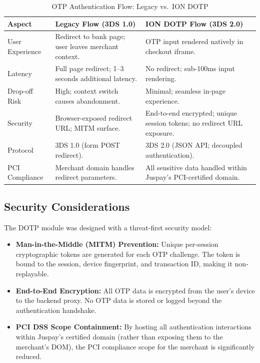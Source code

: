 \begin{table}[ht]
\centering
\caption{OTP Authentication Flow: Legacy vs.\ ION DOTP}
\label{tab:dotp_comparison}
\begin{tabular}{p{4cm} p{5cm} p{5cm}}
\toprule
\textbf{Aspect} & \textbf{Legacy Flow (3DS 1.0)} & \textbf{ION DOTP Flow (3DS 2.0)} \\
\midrule
User Experience    & Redirect to bank page; user leaves merchant context. & OTP input rendered natively in checkout iframe. \\
Latency            & Full page redirect; 1--3 seconds additional latency. & No redirect; sub-100ms input rendering. \\
Drop-off Risk      & High; context switch causes abandonment. & Minimal; seamless in-page experience. \\
Security           & Browser-exposed redirect URL; MITM surface. & End-to-end encrypted; unique session tokens; no redirect URL exposure. \\
Protocol           & 3DS 1.0 (form POST redirect). & 3DS 2.0 (JSON API; decoupled authentication). \\
PCI Compliance     & Merchant domain handles redirect parameters. & All sensitive data handled within Juspay's PCI-certified domain. \\
\bottomrule
\end{tabular}
\end{table}

\subsection{Security Considerations}

The DOTP module was designed with a threat-first security model:

\begin{itemize}
  \item \textbf{Man-in-the-Middle (MITM) Prevention:} Unique per-session cryptographic tokens are generated for each OTP challenge. The token is bound to the session, device fingerprint, and transaction ID, making it non-replayable.
  \item \textbf{End-to-End Encryption:} All OTP data is encrypted from the user's device to the backend proxy. No OTP data is stored or logged beyond the authentication handshake.
  \item \textbf{PCI DSS Scope Containment:} By hosting all authentication interactions within Juspay's certified domain (rather than exposing them to the merchant's DOM), the PCI compliance scope for the merchant is significantly reduced.
\end{itemize}

